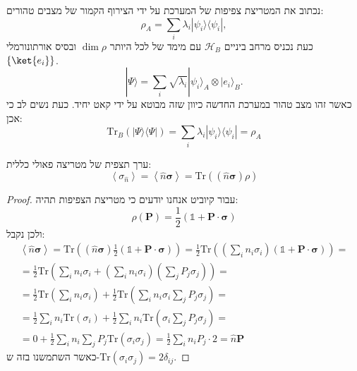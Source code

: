 \documentclass{tstextbook}
\begin{document}
\begin{proposition}
נכתוב את המטריצת צפיפות של המערכת על ידי הצירוף הקמור של מצבים טהורים:
$$\rho_{A}=\sum_{i}\lambda_{i}|\psi_{i}\rangle\langle\psi_{i}|,$$
כעת נכניס מרחב ביניים \(\mathcal{H}_{B}\) עם מימד של לכל היותר \(\dim \rho\) ובסיס אורתונורמלי \(\left\{  \ket{e_{i}}  \right\}\).
$$|\Psi\rangle=\sum_{i}\sqrt{\lambda_{i}}|\psi_{i}\rangle_{A}\otimes|e_{i}\rangle_{B}.$$
כאשר זהו מצב טהור במערכת החדשה כיוון שזה מבוטא על ידי קאט יחיד. כעת נשים לב כי אכן:
$$\mathrm{Tr}_{B}(|\Psi\rangle\langle\Psi|)=\sum_{i}\lambda_{i}|\psi_{i}\rangle\langle\psi_{i}|=\rho_{A}$$

\end{proposition}
\begin{proposition}
ערך תצפית של מטריצה פאולי כללית:
$$\left\langle  \sigma_{\hat{n}}  \right\rangle =\left\langle  \hat{n}\boldsymbol{\sigma}  \right\rangle =\mathrm{Tr}\left( \left( \hat{n}\boldsymbol{\sigma} \right)\rho \right)$$

\end{proposition}
\begin{proof}
עבור קיוביט אנחנו יודעים כי מטריצת הצפיפות תהיה:
$$\rho\left(\mathbf{P}\right)={\frac{1}{2}}\left(\mathbb{1}+\mathbf{P}\cdot\boldsymbol\sigma\right)$$
ולכן נקבל:
\begin{gather*}\left\langle  \hat{n}\boldsymbol{\sigma}  \right\rangle =\mathrm{Tr}\left( \left( \hat{n}\boldsymbol{\sigma} \right){\frac{1}{2}}\left(\mathbb{1}+\mathbf{P}\cdot\boldsymbol\sigma\right) \right)=\frac{1}{2}\mathrm{Tr}\left( \left( \sum_{i}n_{i}\sigma_{i} \right) \left( \mathbb{1} +\mathbf{P}\cdot \boldsymbol{\sigma} \right) \right)=\\=\frac{1}{2}\mathrm{Tr}\left( \sum_{i}n_{i}\sigma_{i} + \left( \sum_{i}n_{i}\sigma_{i} \right)\left( \sum_{j}P_{j}\sigma_{j} \right)\right)=\\=\frac{1}{2}\mathrm{Tr}\left( \sum_{i}n_{i}\sigma_{i} \right)+\frac{1}{2}\mathrm{Tr}\left( \sum_{i}n_{i}\sigma_{i}\sum_{j}P_{j}\sigma_{j} \right)=\\=\frac{1}{2}\sum_{i}n_{i}\mathrm{Tr}\left( \sigma_{i} \right)+\frac{1}{2}\sum_{i}n_{i}\mathrm{Tr}\left( \sigma_{i}\sum_{j}P_{j}\sigma_{j} \right)=\\=0+\frac{1}{2}\sum_{i}n_{i}\sum_{j}P_{j}\mathrm{Tr}\left( \sigma_{i}\sigma_{j} \right)=\frac{1}{2}\sum_{i}n_{i}P_{j}\cdot 2=\hat{n} \mathbf{P} 
\end{gather*}
כאשר השתמשנו בזה ש-\(\mathrm{Tr}\left( \sigma_{i}\sigma_{j} \right)=2\delta_{ij}\).

\end{proof}
\end{document}
